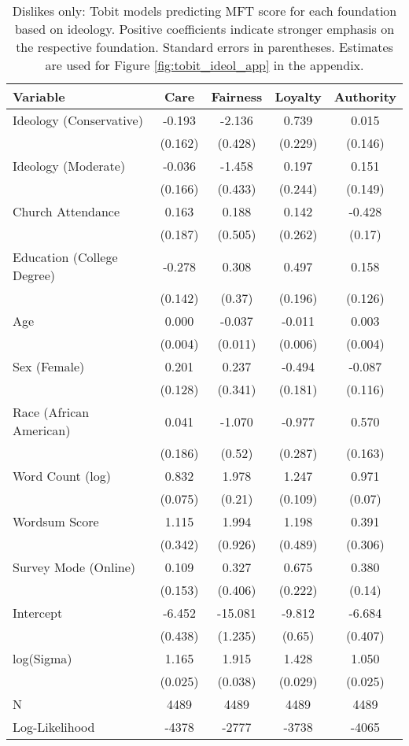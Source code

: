 \begin{table}[ht]
\centering
\caption{Dislikes only: Tobit models predicting MFT score for each foundation based 
           on ideology. Positive coefficients indicate stronger emphasis on the respective 
           foundation. Standard errors in parentheses. Estimates are used for 
           Figure \ref{fig:tobit_ideol_app} in the appendix.} 
\label{tab:tobit_dislike}
\begingroup\footnotesize
\begin{tabular}{lcccc}
  \hline
Variable & Care & Fairness & Loyalty & Authority \\ 
  \hline
Ideology (Conservative) & -0.193 &  -2.136 &  0.739 &  0.015 \\ 
   & (0.162) & (0.428) & (0.229) & (0.146) \\ 
  Ideology (Moderate) & -0.036 &  -1.458 &  0.197 &  0.151 \\ 
   & (0.166) & (0.433) & (0.244) & (0.149) \\ 
  Church Attendance &  0.163 &   0.188 &  0.142 & -0.428 \\ 
   & (0.187) & (0.505) & (0.262) & (0.17) \\ 
  Education (College Degree) & -0.278 &   0.308 &  0.497 &  0.158 \\ 
   & (0.142) & (0.37) & (0.196) & (0.126) \\ 
  Age &  0.000 &  -0.037 & -0.011 &  0.003 \\ 
   & (0.004) & (0.011) & (0.006) & (0.004) \\ 
  Sex (Female) &  0.201 &   0.237 & -0.494 & -0.087 \\ 
   & (0.128) & (0.341) & (0.181) & (0.116) \\ 
  Race (African American) &  0.041 &  -1.070 & -0.977 &  0.570 \\ 
   & (0.186) & (0.52) & (0.287) & (0.163) \\ 
  Word Count (log) &  0.832 &   1.978 &  1.247 &  0.971 \\ 
   & (0.075) & (0.21) & (0.109) & (0.07) \\ 
  Wordsum Score &  1.115 &   1.994 &  1.198 &  0.391 \\ 
   & (0.342) & (0.926) & (0.489) & (0.306) \\ 
  Survey Mode (Online) &  0.109 &   0.327 &  0.675 &  0.380 \\ 
   & (0.153) & (0.406) & (0.222) & (0.14) \\ 
  Intercept & -6.452 & -15.081 & -9.812 & -6.684 \\ 
   & (0.438) & (1.235) & (0.65) & (0.407) \\ 
  log(Sigma) &  1.165 &   1.915 &  1.428 &  1.050 \\ 
   & (0.025) & (0.038) & (0.029) & (0.025) \\ 
   \hline
N & 4489 & 4489 & 4489 & 4489 \\ 
  Log-Likelihood & -4378 & -2777 & -3738 & -4065 \\ 
   \hline
\end{tabular}
\endgroup
\end{table}
